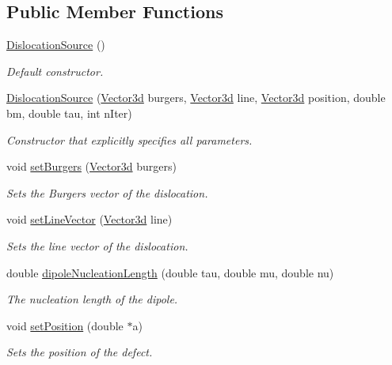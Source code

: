 \subsection*{Public Member Functions}
\begin{DoxyCompactItemize}
\item 
\hyperlink{classDislocationSource_afc9b7984d9486354b6f3d82033707577}{Dislocation\-Source} ()
\begin{DoxyCompactList}\small\item\em Default constructor. \end{DoxyCompactList}\item 
\hyperlink{classDislocationSource_aa5adcc1a0862d8cfa6d8d1a632c3855f}{Dislocation\-Source} (\hyperlink{classVector3d}{Vector3d} burgers, \hyperlink{classVector3d}{Vector3d} line, \hyperlink{classVector3d}{Vector3d} position, double bm, double tau, int n\-Iter)
\begin{DoxyCompactList}\small\item\em Constructor that explicitly specifies all parameters. \end{DoxyCompactList}\item 
void \hyperlink{classDislocationSource_ae1a26d9f8149206b884436f44e92f4c3}{set\-Burgers} (\hyperlink{classVector3d}{Vector3d} burgers)
\begin{DoxyCompactList}\small\item\em Sets the Burgers vector of the dislocation. \end{DoxyCompactList}\item 
void \hyperlink{classDislocationSource_adf7d0b496f5935909daf071a0d733b17}{set\-Line\-Vector} (\hyperlink{classVector3d}{Vector3d} line)
\begin{DoxyCompactList}\small\item\em Sets the line vector of the dislocation. \end{DoxyCompactList}\item 
double \hyperlink{classDislocationSource_ab1a6ecda50cd9bcd70882b75ec6552ac}{dipole\-Nucleation\-Length} (double tau, double mu, double nu)
\begin{DoxyCompactList}\small\item\em The nucleation length of the dipole. \end{DoxyCompactList}\item 
void \hyperlink{classDefect_a2d233d13a8a93f6fba463a1fbc1c6c9f}{set\-Position} (double $\ast$a)
\begin{DoxyCompactList}\small\item\em Sets the position of the defect. \end{DoxyCompactList}\item 

\end{DoxyCompactItemize}
